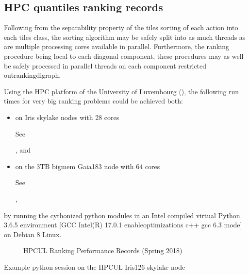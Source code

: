 \documentclass[a4paper,12pt,english]{sphinxhowto}
\let\sphinxpxdimen\pdfpxdimen\else\newdimen\sphinxpxdimen
\begin{document}
\subsection{HPC quantiles ranking records}
\label{\detokenize{tutorial:hpc-quantiles-ranking-records}}
Following from the separability property of the \sphinxhyphen{}tiles sorting of each action into each \sphinxhyphen{}tiles class, the \sphinxhyphen{}sorting algorithm may be safely split into as much threads as are multiple processing cores available in parallel. Furthermore, the ranking procedure being local to each diagonal component, these procedures may as well be safely processed in parallel threads on each component restricted outrankingdigraph.

Using the HPC platform of the University of Luxembourg (), the following run times for very big ranking problems could be achieved both:
\begin{itemize}
\item {} 
on Iris \sphinxhyphen{}skylake nodes with 28 cores %
\begin{footnote}[7]\sphinxAtStartFootnote
See 
%
\end{footnote}, and

\item {} 
on the 3TB \sphinxhyphen{}bigmem Gaia\sphinxhyphen{}183 node with 64 cores %
\begin{footnote}[8]\sphinxAtStartFootnote
See 
%
\end{footnote},

\end{itemize}

by running the cythonized python modules in an Intel compiled virtual Python 3.6.5 environment {[}GCC Intel(R) 17.0.1 \textendash{}enable\sphinxhyphen{}optimizations c++ gcc 6.3 mode{]} on Debian 8 Linux.

\begin{figure}[H]
\centering
\capstart

\noindent\sphinxincludegraphics[width=350\sphinxpxdimen]{{rankingRecords}.png}
\caption{HPC\sphinxhyphen{}UL Ranking Performance Records (Spring 2018)}\label{\detokenize{tutorial:id122}}\end{figure}

Example python session on the HPC\sphinxhyphen{}UL Iris\sphinxhyphen{}126 \sphinxhyphen{}skylake node \sphinxfootnotemark[7]
\end{document}

